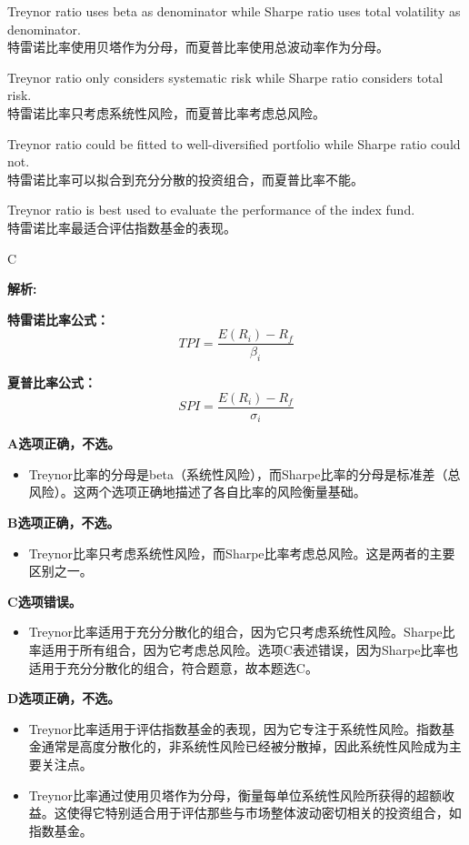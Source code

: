\documentclass{article}
\newenvironment{explanation}
{\textbf{解析:}\par}
{\par}
\begin{document}
\begin{choices}
    \item Treynor ratio uses beta as denominator while Sharpe ratio uses total volatility as denominator.\\
    特雷诺比率使用贝塔作为分母，而夏普比率使用总波动率作为分母。
    \item Treynor ratio only considers systematic risk while Sharpe ratio considers total risk.\\
    特雷诺比率只考虑系统性风险，而夏普比率考虑总风险。
    \item Treynor ratio could be fitted to well-diversified portfolio while Sharpe ratio could not.\\
    特雷诺比率可以拟合到充分分散的投资组合，而夏普比率不能。
    \item Treynor ratio is best used to evaluate the performance of the index fund.\\
    特雷诺比率最适合评估指数基金的表现。
\end{choices}

\begin{correctanswer}
    C
\end{correctanswer}

\begin{explanation}
  

    \textbf{特雷诺比率公式：}
    \[
    TPI = \frac{E(R_i) - R_f}{\beta_i}
    \]

    \textbf{夏普比率公式：}
    \[
    SPI = \frac{E(R_i) - R_f}{\sigma_i}
    \]

    \textbf{A选项正确，不选。}
    \begin{itemize}
        \item Treynor比率的分母是beta（系统性风险），而Sharpe比率的分母是标准差（总风险）。这两个选项正确地描述了各自比率的风险衡量基础。
    \end{itemize}

    \textbf{B选项正确，不选。}
    \begin{itemize}
        \item Treynor比率只考虑系统性风险，而Sharpe比率考虑总风险。这是两者的主要区别之一。
    \end{itemize}

    \textbf{C选项错误。}
    \begin{itemize}
        \item Treynor比率适用于充分分散化的组合，因为它只考虑系统性风险。Sharpe比率适用于所有组合，因为它考虑总风险。选项C表述错误，因为Sharpe比率也适用于充分分散化的组合，符合题意，故本题选C。
    \end{itemize}

    \textbf{D选项正确，不选。}
\begin{itemize}
    \item Treynor比率适用于评估指数基金的表现，因为它专注于系统性风险。指数基金通常是高度分散化的，非系统性风险已经被分散掉，因此系统性风险成为主要关注点。
    \item Treynor比率通过使用贝塔作为分母，衡量每单位系统性风险所获得的超额收益。这使得它特别适合用于评估那些与市场整体波动密切相关的投资组合，如指数基金。
\end{itemize}
\end{explanation}
\end{document}
